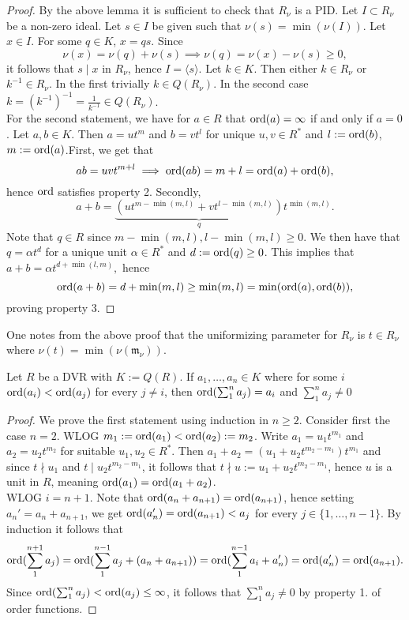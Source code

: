     \begin{proof}
         By the above lemma it is sufficient to check that $R_\nu$ is a PID. Let $I\subset R_\nu$ be a non-zero ideal. Let $s\in I$ be given such that $\nu(s)=\min(\nu(I))$. Let $x\in I$. For some $q\in K$, $x=qs$. Since 
         $$\nu(x)=\nu(q)+\nu(s)\implies \nu(q)=\nu(x)-\nu(s)\geq 0,$$
         it follows that $s\mid x$ in $R_\nu$, hence $I=\langle s\rangle$. Let $k\in K$. Then either $k\in R_\nu$ or $k^{-1}\in R_\nu $. In the first trivially $k\in Q(R_\nu)$. In the second case $k=(k^{-1})^{-1} = \frac{1}{k^{-1}}\in Q(R_\nu)$.\\
         For the second statement, we have for $a\in R$ that $\mathrm{ord}(a)=\infty$ if and only if $a=0$. Let $a,b\in K$. Then $a=ut^m$ and $b=vt^l$ for unique $u,v\in R^\ast$ and $l:=\mathrm{ord}(b)$, $m:=\mathrm{ord}(a)$.First, we get that
         $$ab=uvt^{m+l}\implies \mathrm{ord}(ab)=m+l=\mathrm{ord}(a)+\mathrm{ord}(b),$$
         hence $\mathrm{ord}$ satisfies property 2. Secondly,
         $$a+b = \underbrace{\left(ut^{m-\min(m,l)}+vt^{l-\min(m,l)}\right)}_q t^{\min(m,l)}.$$
         Note that $q\in R$ since $m-\min(m,l),l-\min(m,l)\geq 0$. We then have that $q = \alpha t^d$ for a unique unit $\alpha\in R^\ast$ and $d:=\mathrm{ord}(q)\geq0$. This implies that $a+b = \alpha t^{d+\min(l,m)},$ hence $$\mathrm{ord}(a+b)=d+\min(m,l)\geq \min(m,l)=\min(\mathrm{ord}(a),\mathrm{ord}(b)),$$
         proving property 3.
    \end{proof}
    \begin{remark}
        One notes from the above proof that the uniformizing parameter for $R_\nu$ is $t\in R_\nu$ where $\nu(t)=\min(\nu(\mathfrak{m}_\nu)).$
    \end{remark}
    \begin{lemma}\label{TechnicalDVRLemma}
        Let $R$ be a DVR with $K:=Q(R)$. If $a_1,\dots,a_n\in K$ where for some $i$ $\mathrm{ord}(a_i)<\mathrm{ord}(a_j)$ for every $j\neq i$, then $\mathrm{ord}(\sum_1^n a_j)=a_i$ and $\sum_1^n a_j\neq 0$
    \end{lemma}
    \begin{proof}
        We prove the first statement using induction in $n\geq 2$. Consider first the case $n=2$. WLOG $m_1:=\mathrm{ord}(a_1)<\mathrm{ord}(a_2):=m_2$. Write $a_1=u_1t^{m_1}$ and $a_2=u_2t^{m_2}$ for suitable $u_1,u_2\in R^\ast$. Then
        $a_1+a_2=(u_1+u_2t^{m_2-m_1})t^{m_1}$ and since $t\nmid u_1$ and $t\mid u_2t^{m_2-m_1}$, it follows that $t\nmid u:=u_1+u_2t^{m_2-m_1}$, hence $u$ is a unit in $R$, meaning $\mathrm{ord}(a_1)=\mathrm{ord}(a_1+a_2)$.\\
        WLOG $i=n+1$. Note that $\mathrm{ord}(a_n+a_{n+1})=\mathrm{ord}(a_{n+1})$, hence setting $a_n'=a_n+a_{n+1}$, we get $\mathrm{ord}(a_n')=\mathrm{ord}(a_{n+1})<a_j$ for every $j\in\{1,\dots,n-1\}$. By induction it follows that $$\mathrm{ord}(\sum_1^{n+1} a_j)=\mathrm{ord}(\sum_1^{n-1} a_j+(a_n+a_{n+1}))=\mathrm{ord}(\sum_1^{n-1}a_i+a_n')=\mathrm{ord}(a_n')=\mathrm{ord}(a_{n+1}).$$
        Since $\mathrm{ord}(\sum_1^{n}a_j)<\mathrm{ord}(a_j)\leq \infty$, it follows that $\sum_1^na_{j}\neq 0$ by property 1. of order functions.  
    \end{proof}
